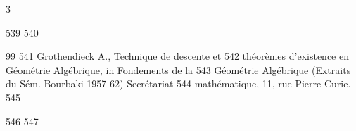 3	\documentclass[10pt]{../fichiers-configuration-latex/smfart}
\begin{document}
   539	
   540	\begin{thebibliography}{99}
   541	 Grothendieck A., Technique de descente et
   542	théorèmes d'existence en Géométrie Algébrique, in Fondements de la
   543	Géométrie Algébrique (Extraits du Sém. Bourbaki 1957-62) Secrétariat
   544	mathématique, 11, rue Pierre Curie.
   545	\end{thebibliography}
   546	
   547	\ifx\danslelivre{}	
\end{document}
